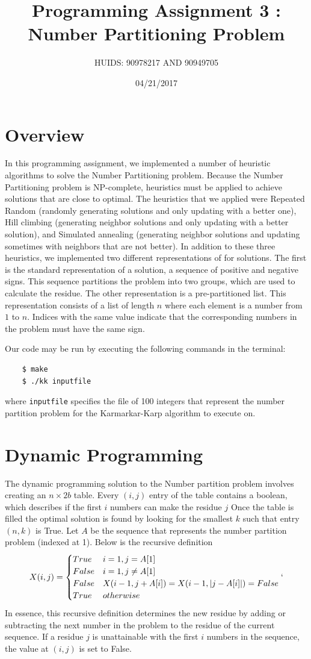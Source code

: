 \documentclass[a4paper]{article}
\title{Programming Assignment 3 : Number Partitioning Problem}
\author{HUIDS: 90978217 AND 90949705}
\date{04/21/2017}
\begin{document}
	
	\maketitle
	
	\section{Overview}
	In this programming assignment, we implemented a number of heuristic algorithms to solve the Number Partitioning problem. Because the Number Partitioning problem is NP-complete, heuristics must be applied to achieve solutions that are close to optimal. The heuristics that we applied were Repeated Random (randomly generating solutions and only updating with a better one), Hill climbing (generating neighbor solutions and only updating with a better solution), and Simulated annealing (generating neighbor solutions and updating sometimes with neighbors that are not better). In addition to these three heuristics, we implemented two different representations of for solutions. The first is the standard representation of a solution, a sequence of positive and negative signs. This sequence partitions the problem into two groups, which are used to calculate the residue. The other representation is a pre-partitioned list. This representation consists of a list of length $n$ where each element is a number from $1$ to $n$. Indices with the same value indicate that the corresponding numbers in the problem must have the same sign.
	
	Our code may be run by executing the following commands in the terminal:
	\begin{verbatim}
	$ make
	$ ./kk inputfile
	\end{verbatim}
	where \texttt{inputfile} specifies the file of 100 integers that represent the number partition problem for the Karmarkar-Karp algorithm to execute on.
	
	\section{Dynamic Programming}
	The dynamic programming solution to the Number partition problem involves creating an $n \times 2b$ table. Every $(i,j)$ entry of the table contains a boolean, which describes if the first $i$ numbers can make the residue $j$  Once the table is filled the optimal solution is found by looking for the smallest $k$ such that entry $(n,k)$ is True. Let $A$ be the sequence that represents the number partition problem (indexed at 1). Below is the recursive definition
	\[X(i,j) = 
	\begin{cases}
	True & i = 1, j = A[1]\\
	False & i = 1, j \neq A[1] \\ 
	False & X(i-1, j + A[i]) = X(i-1, |j - A[i]|) = False \\
	True & otherwise
	\end{cases}`
	\]
	In essence, this recursive definition determines the new residue by adding or subtracting the next number in the problem to the residue of the current sequence. If a residue $j$ is unattainable with the first $i$ numbers in the sequence, the value at $(i,j)$ is set to False. 
	
\end{document}
